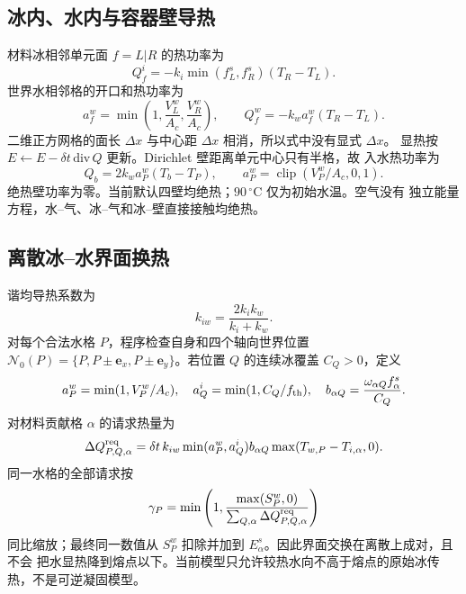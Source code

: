 \documentclass[UTF8,zihao=-4]{ctexart}
\newcommand{\vect}[1]{\boldsymbol{#1}}
\newcommand{\clip}{\operatorname{clip}}
\newcommand{\cellarea}{A_c}
\numberwithin{equation}{section}
\begin{document}
\subsection{冰内、水内与容器壁导热}

材料冰相邻单元面 $f=L|R$ 的热功率为
\begin{equation}
  Q_{f}^{i}=-k_i\min(f_L^s,f_R^s)(T_R-T_L).
  \label{eq:ice-conduction-flux}
\end{equation}
世界水相邻格的开口和热功率为
\begin{equation}
  a_f^w=\min\left(1,\frac{V_L^w}{\cellarea},\frac{V_R^w}{\cellarea}\right),
  \qquad Q_f^w=-k_wa_f^w(T_R-T_L).
  \label{eq:water-conduction-flux}
\end{equation}
二维正方网格的面长 $\Delta x$ 与中心距 $\Delta x$ 相消，所以式中没有显式 $\Delta x$。
显热按 $E\leftarrow E-\delta t\,\mathrm{div}\,Q$ 更新。Dirichlet 壁距离单元中心只有半格，故
入水热功率为
\begin{equation}
  Q_b=2k_wa_P^w(T_b-T_P),
  \qquad a_P^w=\clip(V_P^w/\cellarea,0,1).
  \label{eq:wall-heat-flux}
\end{equation}
绝热壁功率为零。当前默认四壁均绝热；$90\,^{\circ}\mathrm C$ 仅为初始水温。空气没有
独立能量方程，水--气、冰--气和冰--壁直接接触均绝热。

\subsection{离散冰--水界面换热}

谐均导热系数为
\begin{equation}
  k_{iw}=\frac{2k_ik_w}{k_i+k_w}.
\end{equation}
对每个合法水格 $P$，程序检查自身和四个轴向世界位置
$\mathcal N_0(P)=\{P,P\pm\vect e_x,P\pm\vect e_y\}$。若位置 $Q$ 的连续冰覆盖 $C_Q>0$，定义
\begin{equation}
  a_P^w=\min(1,V_P^w/\cellarea),
  \quad a_Q^i=\min(1,C_Q/f_{\rm th}),
  \quad b_{\alpha Q}=\frac{\omega_{\alpha Q}f_\alpha^s}{C_Q}.
\end{equation}
对材料贡献格 $\alpha$ 的请求热量为
\begin{equation}
  \Delta Q_{P,Q,\alpha}^{\rm req}
  =\delta t\,k_{iw}\min(a_P^w,a_Q^i)b_{\alpha Q}
  \max(T_{w,P}-T_{i,\alpha},0).
  \label{eq:interface-heat-request}
\end{equation}
同一水格的全部请求按
\begin{equation}
  \gamma_P=\min\left(1,
  \frac{\max(S_P^w,0)}{\sum_{Q,\alpha}\Delta Q_{P,Q,\alpha}^{\rm req}}
  \right)
\end{equation}
同比缩放；最终同一数值从 $S_P^w$ 扣除并加到 $E_\alpha^s$。因此界面交换在离散上成对，且不会
把水显热降到熔点以下。当前模型只允许较热水向不高于熔点的原始冰传热，不是可逆凝固模型。
\end{document}

